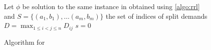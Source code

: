 \begin{figure}[ht]
	\begin{algorithm}[H]
		Let $\phi$ be solution to the same instance in \RRL obtained using \cref{algo:rrl} and $S = \{(a_1, b_1), \ldots (a_m, b_m)\}$ the set of indices of split demands\;
		$D = \max_{1 \leq i < j \leq n} D_{ij}$\;
		$s = 0$\;
		\caption{Algorithm for \RL}
		\label{algo:rl}
	\end{algorithm}
\end{figure}